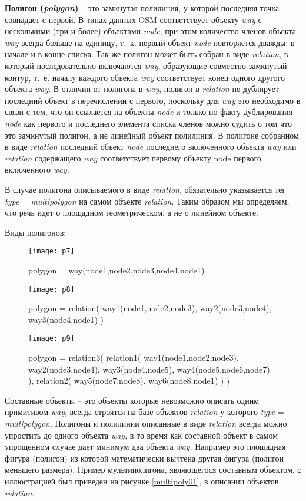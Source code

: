 \textbf{Полигон (\emph{polygon})} -- это замкнутая полилиния, у которой 
последняя точка совпадает с первой. В типах данных OSM соответствует объекту 
\emph{way} с несколькими (три и более) объектами \emph{node}, при этом 
количество членов объекта \emph{way} всегда больше на единицу, т.~к. первый 
объект \emph{node} повторяется дважды: в начале и в конце списка. Так же 
полигон может быть собран в виде \emph{relation}, в который последовательно 
включаются \emph{way}, образующие совместно замкнутый контур, т.~е. началу 
каждого объекта \emph{way} соответствует конец одного другого объекта 
\emph{way}. В отличии от полигона в \emph{way}, полигон в \emph{relation} не 
дублирует последний объект в перечислении с первого, поскольку для \emph{way} 
это необходимо в связи с тем, что он ссылается на объекты \emph{node} и 
только по факту дублирования \emph{node} как первого и последнего элемента 
списка членов можно судить о том что это замкнутый полигон, а не линейный 
объект полилиния. В полигоне собранном в виде \emph{relation} последний объект 
\emph{node} последнего включенного объекта \emph{way} или \emph{relation} 
содержащего \emph{way} соответствует первому объекту node первого включенного 
\emph{way}.

В случае полигона описываемого в виде \emph{relation}, обязательно указывается 
тег \emph{type} = \emph{multipolygon} на самом объекте \emph{relation}. Таким 
образом мы определяем, что речь идет о площадном геометрическом, а не о 
линейном объекте.

Виды полигонов:

\begin{figure}[ht!]
    \center
    \texttt{[image: p7]}
    \caption{polygon = way(node1,node2,node3,node4,node1)}
    \texttt{[image: p8]}
    \caption{polygon = relation( way1(node1,node2,node3), 
        way2(node3,node4), way3(node4,node1) )}
    \texttt{[image: p9]}
    \caption{polygon = relation3( relation1( way1(node1,node2,node3), 
        way2(node3,node4), way3(node4,node5), 
        way4(node5,node6,node7) ), relation2( way5(node7,node8), 
        way6(node8,node1) ) )}
\end{figure}

Составные объекты -- это объекты которые невозможно описать одним примитивом 
\emph{way}, всегда строятся на базе объектов \emph{relation} у которого 
\emph{type} = \emph{multipolygon}. Полигоны и полилинии описанные в виде 
\emph{relation} всегда можно упростить до одного объекта \emph{way}, в то 
время как составной объект в самом упрощенном случае дает минимум два объекта 
\emph{way}. Например это площадная фигура (полигон) из которой математически 
вычтена другая фигура (полигон меньшего размера). Пример мультиполигона, 
являющегося составным объектом, с иллюстрацией был приведен на рисунке 
\ref{multipoly01}, в описании объектов \emph{relation}.

